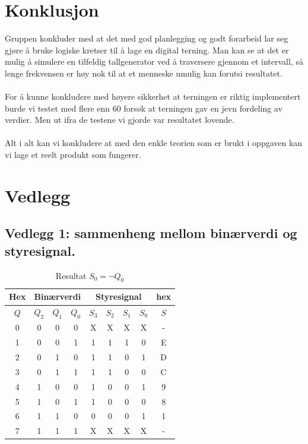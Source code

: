 \documentclass[12pt,norsk,a4paper]{article}
\begin{document}
\clearpage

\section{Konklusjon}
Gruppen konkluder med at det med god planlegging og godt forarbeid lar seg gjøre å bruke logiske kretser til å lage en digital terning. Man kan se at det er mulig å simulere en tilfeldig tallgenerator ved å traversere gjennom et intervall, så lenge frekvensen er høy nok til at et menneske umulig kan forutsi resultatet. \\
\\
For å kunne konkludere med høyere sikkerhet at terningen er riktig implementert burde vi testet med flere enn 60 forsøk at terningen gav en jevn fordeling av verdier. Men ut ifra de testene vi gjorde var resultatet lovende. \\
\\
Alt i alt kan vi konkludere at med den enkle teorien som er brukt i oppgaven kan vi lage et reelt produkt som fungerer. 

\clearpage

\section{Vedlegg}
    \subsection{Vedlegg 1: sammenheng mellom binærverdi og styresignal.}
    \begin{table}[H]
    \begin{center}
    \begin{tabular}{|c|c|c|c|c|c|c|c|c|}
    \hline
    Hex & \multicolumn{3}{c}{Binærverdi} & \multicolumn{4}{|c|}{Styresignal}&hex \\ \hline
    $Q$ & $Q_2$ & $Q_1$ & $Q_0$ & $S_3$ & $S_2$ & $S_1$ & $S_0$ & $S$ \\ \hline
    0 & 0 & 0 & 0 & X & X & X & X & - \\ \hline 
    1 & 0 & 0 & 1 & 1 & 1 & 1 & 0 & E \\ \hline
    2 & 0 & 1 & 0 & 1 & 1 & 0 & 1 & D \\ \hline
    3 & 0 & 1 & 1 & 1 & 1 & 0 & 0 & C \\ \hline
    4 & 1 & 0 & 0 & 1 & 0 & 0 & 1 & 9 \\ \hline
    5 & 1 & 0 & 1 & 1 & 0 & 0 & 0 & 8 \\ \hline
    6 & 1 & 1 & 0 & 0 & 0 & 0 & 1 & 1 \\ \hline
    7 & 1 & 1 & 1 & X & X & X & X & - \\ \hline
    \end{tabular}
    \end{center}
    \caption{Resultat $S_0=\neg Q_0$}
    \end{table}
    \clearpage
\end{document}
